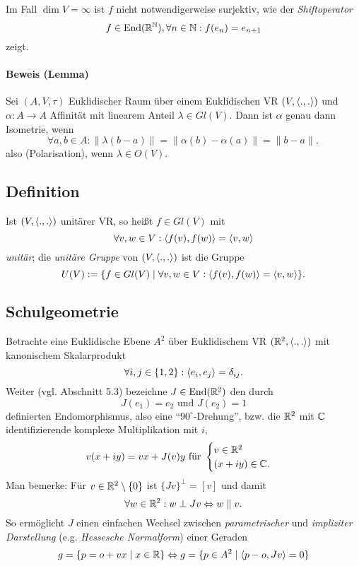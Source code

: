 	Im Fall $ \dim V = \infty $ ist $ f $ nicht notwendigerweise surjektiv, wie der \emph{Shiftoperator}
		\[ f\in \operatorname{End}(\mathbb{R}^{\mathbb{N}}), \forall n\in \mathbb{N}: f(e_n) = e_{n+1} \]
	zeigt.
\paragraph{Beweis (Lemma)}
	Sei $ (A,V,\tau) $ Euklidischer Raum über einem Euklidischen VR $ (V,\langle .,. \rangle) $ und $\alpha:A\to A $ Affinität mit linearem Anteil $ \lambda\in Gl(V) $. Dann ist $ \alpha $ genau dann Isometrie, wenn
		\[ \forall a,b\in A: \|\lambda(b-a)\| = \|\alpha(b)-\alpha(a)\| = \|b-a\|,  \]
	also (Polarisation), wenn $ \lambda\in O(V) $.
\subsection{Definition}
\begin{Definition}
	Ist $ (V,\langle .,. \rangle) $ unitärer VR, so heißt $ f\in Gl(V) $ mit
		\[ \forall v,w\in V: \langle f(v),f(w) \rangle = \langle v,w \rangle \]
	\emph{unitär}; die \emph{unitäre Gruppe} von $ (V,\langle .,. \rangle) $ ist die Gruppe
		\[ U(V) := \{f\in Gl(V)\mid \forall v,w\in V: \langle f(v),f(w) \rangle = \langle v,w \rangle \}. \]
\end{Definition}


\subsection{Schulgeometrie}
	Betrachte eine Euklidische Ebene $ A^2 $ über Euklidischem VR $ (\mathbb{R}^2,\langle .,. \rangle) $ mit kanonischem Skalarprodukt
		\[ \forall i,j\in \{1,2\}:\langle e_i,e_j \rangle = \delta_{ij}. \]
	Weiter (vgl. Abschnitt 5.3) bezeichne $ J\in \operatorname{End}(\mathbb{R}^2) $ den durch
		\[ J(e_1) = e_2 \text{ und } J(e_2) = 1 \]
	definierten Endomorphismus, also eine "`$ 90^{\circ}$-Drehung"',
	bzw. die $ \mathbb{R}^2 $ mit $ \mathbb{C} $ identifizierende komplexe Multiplikation mit $ i $,
		\[ v(x+iy) = vx+J(v)y \text{ für }\begin{cases}
		v\in \mathbb{R}^2\\ (x+iy)\in \mathbb{C}.
		\end{cases} \]
	Man bemerke: Für $ v\in \mathbb{R}^2\setminus \{0\} $ ist $ \{Jv\}^\perp = [v] $ und damit
		\[ \forall w\in \mathbb{R}^2: w\perp Jv \Leftrightarrow w\parallel v. \]
	So ermöglicht $ J $ einen einfachen Wechsel zwischen \emph{parametrischer} und \emph{impliziter Darstellung} (e.g. \emph{Hessesche Normalform}) einer Geraden
		\[ g = \{p = o + vx\mid x\in \mathbb{R}\} \Leftrightarrow g = \{p\in A^2\mid \langle p-o,Jv \rangle = 0\} \]
